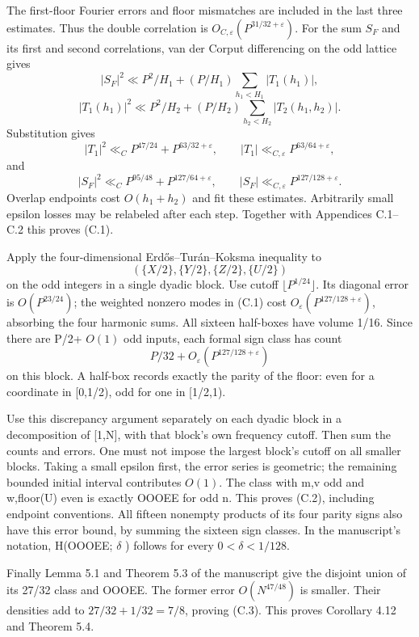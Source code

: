 \documentclass[11pt,a4paper]{article}
\begin{document}
\endgroup

The first-floor Fourier errors and floor mismatches are included in the
last three estimates. Thus the double correlation is
\(O_{C,\varepsilon}(P^{31/32+\varepsilon})\). For the sum \(S_F\) and
its first and second correlations, van der Corput differencing on the
odd lattice gives \[
|S_F|^2\ll P^2/H_1+(P/H_1)\sum_{h_1<H_1}|T_1(h_1)|,
\] \[
|T_1(h_1)|^2\ll P^2/H_2+(P/H_2)\sum_{h_2<H_2}|T_2(h_1,h_2)|.
\] Substitution gives \[
|T_1|^2\ll_C P^{47/24}+P^{63/32+\varepsilon},
\qquad |T_1|\ll_{C,\varepsilon}P^{63/64+\varepsilon},
\] and \[
|S_F|^2\ll_C P^{95/48}+P^{127/64+\varepsilon},
\qquad |S_F|\ll_{C,\varepsilon}P^{127/128+\varepsilon}.
\] Overlap endpoints cost \(O(h_1+h_2)\) and fit these estimates.
Arbitrarily small epsilon losses may be relabeled after each step.
Together with Appendices C.1--C.2 this proves (C.1).

Apply the four-dimensional Erd\H{o}s--Tur\'{a}n--Koksma inequality to \[
(\{X/2\},\{Y/2\},\{Z/2\},\{U/2\})
\] on the odd integers in a single dyadic block. Use cutoff
\(\lfloor P^{1/24}\rfloor\). Its diagonal error is \(O(P^{23/24})\); the
weighted nonzero modes in (C.1) cost
\(O_\varepsilon(P^{127/128+\varepsilon})\), absorbing the four harmonic
sums. All sixteen half-boxes have volume 1/16. Since there are P/2+
\(O(1)\) odd inputs, each formal sign class has count \[
P/32+O_\varepsilon(P^{127/128+\varepsilon})
\] on this block. A half-box records exactly the parity of the floor:
even for a coordinate in {[}0,1/2), odd for one in {[}1/2,1).

Use this discrepancy argument separately on each dyadic block in a
decomposition of {[}1,N{]}, with that block's own frequency cutoff. Then
sum the counts and errors. One must not impose the largest block's
cutoff on all smaller blocks. Taking a small epsilon first, the error
series is geometric; the remaining bounded initial interval contributes
\(O(1)\). The class with m,v odd and w,floor(U) even is exactly OOOEE
for odd n. This proves (C.2), including endpoint conventions. All
fifteen nonempty products of its four parity signs also have this error
bound, by summing the sixteen sign classes. In the manuscript's
notation, H(OOOEE; \(\delta\) ) follows for every \(0<\delta<1/128\).

Finally Lemma 5.1 and Theorem 5.3 of the manuscript give the disjoint
union of its 27/32 class and OOOEE. The former error \(O(N^{47/48})\) is
smaller. Their densities add to \(27/32+1/32=7/8\), proving (C.3). This
proves Corollary 4.12 and Theorem 5.4.
\end{document}
